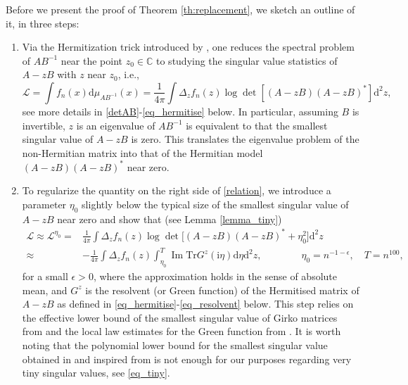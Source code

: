 \documentclass[10pt,reqno]{amsart}
\renewcommand{\Im}{\operatorname{Im}}
\newcommand{\C}{{\mathbb{C}}}
\newcommand{\dd}{\mathrm{d}}
\newcommand{\ii}{\mathrm{i}}
\newcommand{\ie}{i.e., }
\newcommand{\<}{\langle}
\renewcommand{\>}{\rangle}
\newcommand{\AG}{A^{\mathrm{Gin}}}
\newcommand{\BG}{B^{\mathrm{Gin}}}
\newcommand{\MG}{M^{\mathrm{Gin}}}
\numberwithin{equation}{section}
\begin{document}



\bigskip

Before we present the proof of Theorem \ref{th:replacement}, we sketch an outline of it, in three steps:
\begin{enumerate}
	\item Via the Hermitization trick introduced by \cite{zbMATH03901742}, one reduces the spectral problem of $AB^{-1}$ near the point $z_0\in \C$ to studying the singular value statistics of $A-zB$ with $z$ near $z_0$, \ie
	\begin{equation}\label{relation}
		\mathcal{L}= \int f_n(x)\dd\mu_{AB^{-1}}(x)=\frac{1}{4\pi} \int \Delta_z f_n(z) \log \det [(A-zB) (A-zB)^*]\dd^2 z,
	\end{equation}
	 see more details in \eqref{detAB}-\eqref{eq_hermitise} below. In particular, assuming $B$ is invertible, $z$ is an eigenvalue of $AB^{-1}$ is equivalent to that the smallest singular value of $A-zB$ is zero. This translates the eigenvalue problem of the non-Hermitian matrix into that of the Hermitian model $(A-zB) (A-zB)^*$ near zero. 
	
	\item To regularize the quantity on the right side of \eqref{relation}, we introduce a parameter $\eta_0$ slightly below the typical size of the smallest singular value of $A-zB$ near zero and show that (see Lemma \ref{lemma_tiny})
	\begin{align}\label{approx}
		\mathcal{L} \approx \mathcal{L}^{\eta_0}=&\frac{1}{4\pi} \int \Delta_z f_n(z) \log \det \big[(A-zB) (A-zB)^*+\eta_0^2\big]\dd^2 z\nonumber\\
		\approx&-\frac{1}{4\pi} \int \Delta_z f_n(z) \int_{\eta_0}^{T} \Im \mathrm{Tr} G^{z}(\ii \eta) \dd \eta \dd^2 z, \qquad \qquad \eta_0=n^{-1-\epsilon}, \quad T=n^{100},
	\end{align}
     for a small $\epsilon>0$, where the approximation holds in the sense of absolute mean, and $G^{z}$ is the resolvent (or Green function) of the Hermitised matrix of $A-zB$ as defined in \eqref{eq_hermitise}-\eqref{eq_resolvent} below. This step relies on the effective lower bound of the smallest singular value of Girko matrices from %
     \cite{Davies} and the local law estimates for the Green function from \cite{zbMATH06347297}. It is worth noting that the polynomial lower bound for the smallest singular value obtained in \cite{MR2908617} and inspired from \cite{MR2684367} is not enough for our purposes regarding very tiny singular values, see \eqref{eq_tiny}.
   

\end{enumerate}
\end{document}
